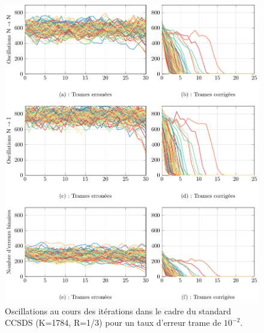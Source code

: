 \begin{figure}[!ht]
	\begin{center}
	\includegraphics[width=\textwidth]{main/ch2_fig/tikz/it_ccsds10-2.pdf}
	\caption{Oscillations au cours des itérations dans le cadre du standard CCSDS (K=1784, R=1/3) pour un taux d'erreur trame de $10^{-2}$.\label{fig:it1_ccsds}}
	\end{center}
\end{figure}

